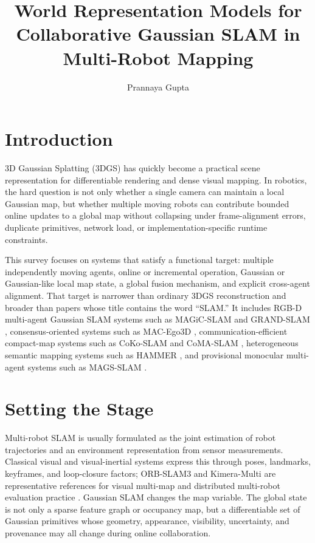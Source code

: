 \documentclass[11pt, a4paper, logo]{googledeepmind}
\title{World Representation Models for Collaborative Gaussian SLAM in Multi-Robot Mapping}
\author[1]{Prannaya Gupta}
\affil[1]{Pragnition Labs}
\date{}
\begin{document}
\maketitle

\section{Introduction}

3D Gaussian Splatting (3DGS) has quickly become a practical scene representation for differentiable rendering and dense visual mapping. In robotics, the hard question is not only whether a single camera can maintain a local Gaussian map, but whether multiple moving robots can contribute bounded online updates to a global map without collapsing under frame-alignment errors, duplicate primitives, network load, or implementation-specific runtime constraints.

This survey focuses on systems that satisfy a functional target: multiple independently moving agents, online or incremental operation, Gaussian or Gaussian-like local map state, a global fusion mechanism, and explicit cross-agent alignment. That target is narrower than ordinary 3DGS reconstruction and broader than papers whose title contains the word ``SLAM.'' It includes RGB-D multi-agent Gaussian SLAM systems such as MAGiC-SLAM and GRAND-SLAM \citep{yugay2025magic_slam,thomas2025grand_slam}, consensus-oriented systems such as MAC-Ego3D \citep{xu2024mac_ego3d}, communication-efficient compact-map systems such as CoKo-SLAM and CoMA-SLAM \citep{li2026coko_slam,chen2026coma_slam}, heterogeneous semantic mapping systems such as HAMMER \citep{yu2025hammer}, and provisional monocular multi-agent systems such as MAGS-SLAM \citep{cao2026mags_slam}.

\section{Setting the Stage}

Multi-robot SLAM is usually formulated as the joint estimation of robot trajectories and an environment representation from sensor measurements. Classical visual and visual-inertial systems express this through poses, landmarks, keyframes, and loop-closure factors; ORB-SLAM3 and Kimera-Multi are representative references for visual multi-map and distributed multi-robot evaluation practice \citep{campos2021orb_slam3,tian2023kimera_multi}. Gaussian SLAM changes the map variable. The global state is not only a sparse feature graph or occupancy map, but a differentiable set of Gaussian primitives whose geometry, appearance, visibility, uncertainty, and provenance may all change during online collaboration.
\end{document}
